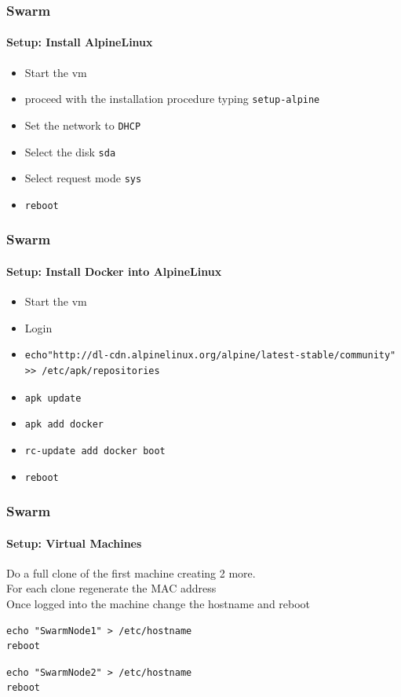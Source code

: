 \begin{frame}[fragile]
\frametitle{Swarm}
\framesubtitle{Setup: Install AlpineLinux}
\begin{itemize}
\item Start the vm 
\item proceed with the installation procedure typing \lstinline!setup-alpine!
\item Set the network to \lstinline!DHCP!\\
\item Select the disk \lstinline!sda!
\item Select request mode \lstinline!sys!
\item \lstinline!reboot!
\end{itemize}
\end{frame}


\begin{frame}[fragile]
\frametitle{Swarm}
\framesubtitle{Setup: Install Docker into AlpineLinux}
\begin{itemize}
\item Start the vm
\item Login
\item 
\tiny
\begin{lstlisting}
echo"http://dl-cdn.alpinelinux.org/alpine/latest-stable/community" >> /etc/apk/repositories
\end{lstlisting}
\normalsize
\item \lstinline!apk update!
\item \lstinline!apk add docker!
\item \lstinline!rc-update add docker boot!
\item \lstinline!reboot!
\end{itemize}
\end{frame}


\begin{frame}[fragile]
\frametitle{Swarm}
\framesubtitle{Setup: Virtual Machines}
Do a full clone of the first machine creating 2 more.\\
\vspace{0.4cm}
For each clone regenerate the MAC address\\
\vspace{0.4cm}
Once logged into the machine change the hostname and reboot\\
\begin{lstlisting}
echo "SwarmNode1" > /etc/hostname
reboot
\end{lstlisting}

\begin{lstlisting}
echo "SwarmNode2" > /etc/hostname
reboot
\end{lstlisting}
\end{frame}


